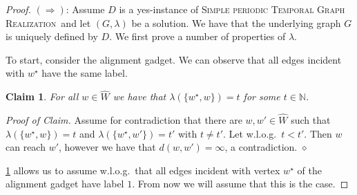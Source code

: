 \documentclass[11pt,a4paper]{article}
\newtheorem{claim}[theorem]{Claim}
\theoremstyle{remark}
\theoremstyle{definition}
\newenvironment{claimproof}{\noindent\emph{Proof of Claim.}}{\hfill$\diamond$

}
\newcommand{\deltaExactLong}{\textsc{Simple periodic Temporal Graph Realization}}
\begin{document}
\begin{proof}
$(\Rightarrow)$: Assume $D$ is a yes-instance of \deltaExactLong\ and let $(G,\lambda)$ be a solution. We have that the underlying graph $G$ is uniquely defined by $D$. We first prove a number of properties of $\lambda$.

To start, consider the alignment gadget. We can observe that all edges incident with $w^\star$ have the same label.
\begin{claim}\label{claim:1}
    For all $w\in \hat{W}$ we have that $\lambda(\{w^\star,w\})=t$ for some $t\in\mathbb{N}$.
\end{claim}
\begin{claimproof}
    Assume for contradiction that there are $w,w'\in \hat{W}$ such that $\lambda(\{w^\star,w\})=t$ and $\lambda(\{w^\star,w'\})=t'$ with $t\neq t'$. Let w.l.o.g.\ $t<t'$. Then $w$ can reach $w'$, however we have that $d(w,w')=\infty$, a contradiction.
\end{claimproof}
\cref{claim:1} allows us to assume w.l.o.g.\ that all edges incident with vertex $w^\star$ of the alignment gadget have label $1$. From now we will assume that this is the case.


\end{proof}
\end{document}
